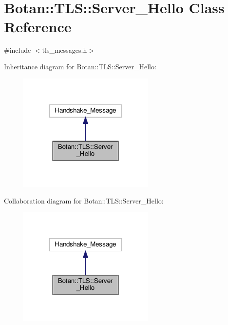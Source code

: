 \hypertarget{class_botan_1_1_t_l_s_1_1_server___hello}{}\section{Botan\+:\+:T\+LS\+:\+:Server\+\_\+\+Hello Class Reference}
\label{class_botan_1_1_t_l_s_1_1_server___hello}


{\ttfamily \#include $<$tls\+\_\+messages.\+h$>$}



Inheritance diagram for Botan\+:\+:T\+LS\+:\+:Server\+\_\+\+Hello\+:
\nopagebreak
\begin{figure}[H]
\begin{center}
\leavevmode
\includegraphics[width=191pt]{class_botan_1_1_t_l_s_1_1_server___hello__inherit__graph}
\end{center}
\end{figure}


Collaboration diagram for Botan\+:\+:T\+LS\+:\+:Server\+\_\+\+Hello\+:
\nopagebreak
\begin{figure}[H]
\begin{center}
\leavevmode
\includegraphics[width=191pt]{class_botan_1_1_t_l_s_1_1_server___hello__coll__graph}
\end{center}
\end{figure}
